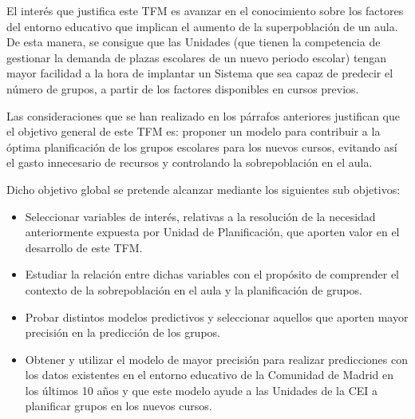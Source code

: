 El interés que justifica este TFM es avanzar en el conocimiento sobre los factores del entorno educativo que implican el aumento de la superpoblación de un aula. De esta manera, se consigue que las Unidades (que tienen la competencia de gestionar la demanda de plazas escolares de un nuevo periodo escolar) tengan mayor facilidad a la hora de implantar un Sistema que sea capaz de predecir el número de grupos, a partir de los factores disponibles en cursos previos.

Las consideraciones que se han realizado en los párrafos anteriores justifican que el objetivo general de este TFM es: proponer un modelo para contribuir a la óptima planificación de los grupos escolares para los nuevos cursos, evitando así el gasto innecesario de recursos y controlando la sobrepoblación en el aula.

Dicho objetivo global se pretende alcanzar mediante los siguientes sub objetivos:
\begin{itemize}
	\item Seleccionar variables de interés, relativas a la resolución de la necesidad anteriormente expuesta por Unidad de Planificación, que aporten valor en el desarrollo de este TFM. %
	\item Estudiar la relación entre dichas variables con el propósito de comprender el contexto de la sobrepoblación en el aula y la planificación de grupos.
	\item Probar distintos modelos predictivos y seleccionar aquellos que aporten mayor precisión en la predicción de los grupos. 
	\item Obtener y utilizar el modelo de mayor precisión para realizar predicciones con los datos existentes en el entorno educativo de la Comunidad de Madrid en los últimos 10 años y que este modelo ayude a las Unidades de la CEI a planificar grupos en los nuevos cursos. 
\end{itemize}

